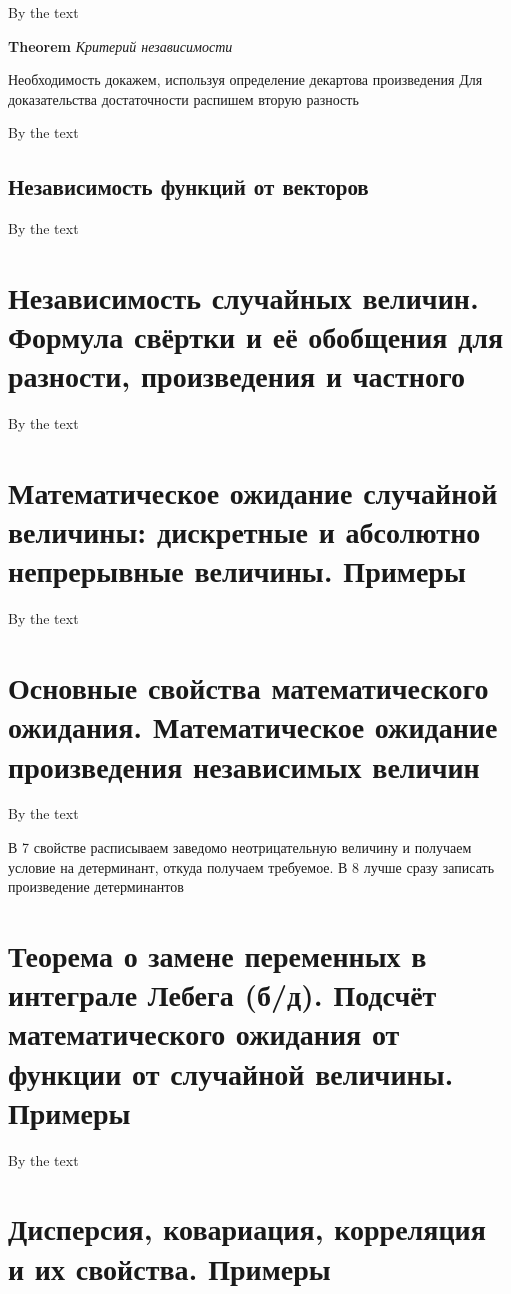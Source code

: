 \documentclass[a4paper, 14pt]{article}
\begin{document}
    By the text
    
    \textbf{Theorem} \textit{Критерий независимости}
    
    Необходимость докажем, используя определение декартова произведения
    Для доказательства достаточности распишем вторую разность
    
    By the text
    
    \subsection{Независимость функций от векторов}
    
    By the text
    
    \section{Независимость случайных величин. Формула свёртки и её обобщения для разности, произведения и частного}
    
    By the text
    
    \section{Математическое ожидание случайной величины: дискретные и абсолютно непрерывные величины.
    Примеры}
    
    By the text
    
    \section{Основные свойства математического ожидания.
    Математическое ожидание произведения независимых величин}
    
    By the text
    
    В 7 свойстве расписываем заведомо неотрицательную величину и получаем условие на детерминант, откуда получаем
    требуемое.
    В 8 лучше сразу записать произведение детерминантов
    
    \section{Теорема о замене переменных в интеграле Лебега (б/д).
    Подсчёт математического ожидания от функции от случайной величины.
    Примеры}
    
    By the text
    
    \section{Дисперсия, ковариация, корреляция и их свойства.
    Примеры}
    
\end{document}
